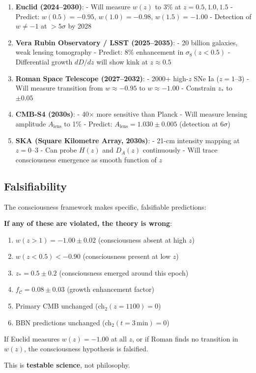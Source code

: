 \begin{enumerate}
\item \textbf{Euclid (2024--2030)}\cite{euclid2011}:
  - Will measure $w(z)$ to 3\% at $z = 0.5, 1.0, 1.5$
  - Predict: $w(0.5) = -0.95$, $w(1.0) = -0.98$, $w(1.5) = -1.00$
  - Detection of $w \neq -1$ at $>5\sigma$ by 2028

\item \textbf{Vera Rubin Observatory / LSST (2025--2035)}\cite{lsst2009}:
  - 20 billion galaxies, weak lensing tomography
  - Predict: 8\% enhancement in $\sigma_8(z < 0.5)$
  - Differential growth $dD/dz$ will show kink at $z \approx 0.5$

\item \textbf{Roman Space Telescope (2027--2032)}\cite{roman2015}:
  - 2000+ high-$z$ SNe Ia ($z = 1\text{--}3$)
  - Will measure transition from $w \approx -0.95$ to $w \approx -1.00$
  - Constrain $z_*$ to $\pm 0.05$

\item \textbf{CMB-S4 (2030s)}\cite{cmbs42019}:
  - 40$\times$ more sensitive than Planck
  - Will measure lensing amplitude $A_{\text{lens}}$ to 1\%
  - Predict: $A_{\text{lens}} = 1.030 \pm 0.005$ (detection at $6\sigma$)

\item \textbf{SKA (Square Kilometre Array, 2030s)}\cite{ska2015}:
  - 21-cm intensity mapping at $z = 0\text{--}3$
  - Can probe $H(z)$ and $D_A(z)$ continuously
  - Will trace consciousness emergence as smooth function of $z$
\end{enumerate}

\subsection{Falsifiability}

\begin{keyidea}
The consciousness framework makes specific, falsifiable predictions:

\textbf{If any of these are violated, the theory is wrong}:
\begin{enumerate}
\item $w(z > 1) = -1.00 \pm 0.02$ (consciousness absent at high $z$)
\item $w(z < 0.5) < -0.90$ (consciousness present at low $z$)
\item $z_* = 0.5 \pm 0.2$ (consciousness emerged around this epoch)
\item $f_{\mathcal{C}} = 0.08 \pm 0.03$ (growth enhancement factor)
\item Primary CMB unchanged (ch$_2(z=1100) = 0$)
\item BBN predictions unchanged (ch$_2(t=3 \, \text{min}) = 0$)
\end{enumerate}

If Euclid measures $w(z) = -1.00$ at all $z$, or if Roman finds no transition in $w(z)$, the consciousness hypothesis is falsified.

This is \textbf{testable science}, not philosophy.
\end{keyidea}

